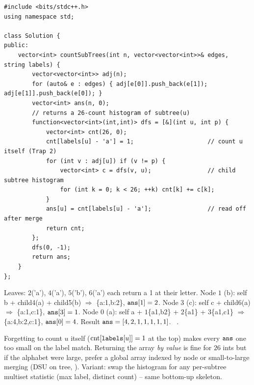 \begin{lstlisting}[caption={Nodes in Sub-Tree With the Same Label (LeetCode 1519)}, label={lst:c04-subtree-label}]
#include <bits/stdc++.h>
using namespace std;

class Solution {
public:
    vector<int> countSubTrees(int n, vector<vector<int>>& edges, string labels) {
        vector<vector<int>> adj(n);
        for (auto& e : edges) { adj[e[0]].push_back(e[1]); adj[e[1]].push_back(e[0]); }
        vector<int> ans(n, 0);
        // returns a 26-count histogram of subtree(u)
        function<vector<int>(int,int)> dfs = [&](int u, int p) {
            vector<int> cnt(26, 0);
            cnt[labels[u] - 'a'] = 1;                     // count u itself (Trap 2)
            for (int v : adj[u]) if (v != p) {
                vector<int> c = dfs(v, u);                // child subtree histogram
                for (int k = 0; k < 26; ++k) cnt[k] += c[k];
            }
            ans[u] = cnt[labels[u] - 'a'];                // read off after merge
            return cnt;
        };
        dfs(0, -1);
        return ans;
    }
};
\end{lstlisting}

\begin{tracebox}[$G$ rooted at $0$, $\code{labels}=$ \texttt{"abacaba"} (nodes $0..6$)]
Leaves: $2$('a'), $4$('a'), $5$('b'), $6$('a') each return a 1 at their letter.
Node $1$ (b): self b + child4(a) + child5(b) $\Rightarrow$ \{a:1,b:2\}, $\texttt{ans}[1]=2$.
Node $3$ (c): self c + child6(a) $\Rightarrow$ \{a:1,c:1\}, $\texttt{ans}[3]=1$.
Node $0$ (a): self a + $1$\{a1,b2\} + $2$\{a1\} + $3$\{a1,c1\} $\Rightarrow$ \{a:4,b:2,c:1\}, $\texttt{ans}[0]=4$.
Result $\texttt{ans}=[4,2,1,1,1,1,1]$. \checkmark\ .
\end{tracebox}


\begin{warningbox}
Forgetting to count $u$ itself ($\text{cnt}[\texttt{labels}[u]]=1$ at the top) makes every
$\texttt{ans}$ one too small on the label match. Returning the array \emph{by value} is fine
for $26$ ints but if the alphabet were large, prefer a global array indexed by node or
small-to-large merging (DSU on tree, ). Variant: swap the histogram for any
per-subtree multiset statistic (max label, distinct count) -- same bottom-up skeleton.
\end{warningbox}

